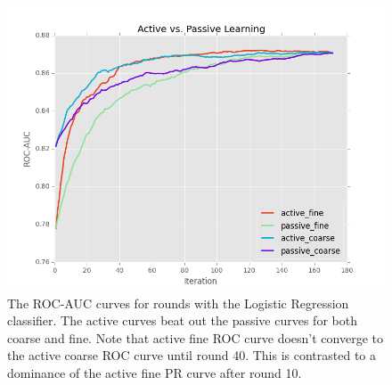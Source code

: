 \documentclass[ms]{nuthesis}
\begin{document}
\FloatBarrier
\begin{figure}[!htb]
	\centering
    \includegraphics[width=1.0\columnwidth]{fig/runActPassLogReg_roc}
    \caption{The ROC-AUC curves for rounds with the
Logistic Regression classifier. The active curves beat out the passive
curves for both coarse and fine. Note that active fine ROC curve doesn't
converge to the active coarse ROC curve until round 40. This is contrasted
to a dominance of the active fine PR curve after round 10.}
\label{fig:runActPassLogReg_roc}
\end{figure}
\FloatBarrier
\end{document}
